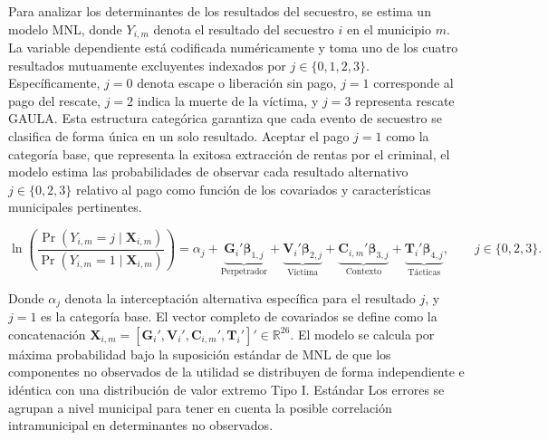 \documentclass[12pt]{article}
\theoremstyle{definition}
\theoremstyle{remark}
\newcommand{\1}{\mathbf{1}}
\begin{document}
Para analizar los determinantes de los resultados del secuestro, se estima un modelo MNL, donde $Y_{i,m}$ denota el resultado del secuestro $i$ en el municipio $m$. La variable dependiente está codificada numéricamente y toma uno de los cuatro resultados mutuamente excluyentes indexados por $j \in \{0,1,2,3\}$. Específicamente, $j=0$ denota escape o liberación sin pago, $j=1$ corresponde al pago del rescate, $j=2$ indica la muerte de la víctima, y $j=3$ representa rescate GAULA. Esta estructura categórica garantiza que cada evento de secuestro se clasifica de forma única en un solo resultado. Aceptar el pago $j=1$ como la categoría base, que representa la exitosa extracción de rentas por el criminal, el modelo estima las probabilidades de observar cada resultado alternativo $j \in \{0,2,3\}$ relativo al pago como función de los covariados y características municipales pertinentes.


\begin{equation} \label{MNL}
\ln \left( \frac{\Pr(Y_{i,m} = j \mid \mathbf{X}_{i,m})}{\Pr(Y_{i,m} = 1 \mid \mathbf{X}_{i,m})} \right)
=
\alpha_j
+
\underbrace{\mathbf{G}_i' \boldsymbol{\beta}_{1,j}}_{\text{Perpetrador}}
+
\underbrace{\mathbf{V}_i' \boldsymbol{\beta}_{2,j}}_{\text{Víctima}}
+
\underbrace{\mathbf{C}_{i,m}' \boldsymbol{\beta}_{3,j}}_{\text{Contexto}}
+
\underbrace{\mathbf{T}_i' \boldsymbol{\beta}_{4,j}}_{\text{Tácticas}},
\qquad j \in \{0,2,3\}.
\end{equation}

\noindent Donde $\alpha_j$ denota la interceptación alternativa específica para el resultado $j$, y $j=1$ es la categoría base. El vector completo de covariados se define como la concatenación $\mathbf{X}_{i,m} = [\mathbf{G}_i', \mathbf{V}_i', \mathbf{C}_{i,m}', \mathbf{T}_i']' \in \mathbb{R}^{26}$. El modelo se calcula por máxima probabilidad bajo la suposición estándar de MNL de que los componentes no observados de la utilidad se distribuyen de forma independiente e idéntica con una distribución de valor extremo Tipo I. Estándar Los errores se agrupan a nivel municipal para tener en cuenta la posible correlación intramunicipal en determinantes no observados.
\end{document}

